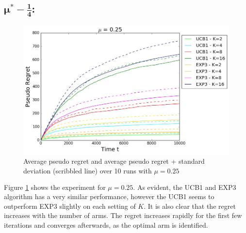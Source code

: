 \documentclass{article}
\begin{document}
\subsection{$\mathbf{\mu^* - \frac{1}{4}}$:}
\begin{figure}[H]
 \centering  \includegraphics[width=17cm]{fig/000.jpg}
  \caption{\footnotesize Average pseudo regret and average pseudo regret + standard deviation (scribbled line) over 10 runs with $\mu = 0.25$ }
\label{fig:1}
\end{figure}
Figure \ref{fig:1} shows the experiment for $\mu = 0.25$. As evident, the UCB1 and EXP3 algorithm has a very similar performance, however the UCB1 seems to outperform EXP3 slightly on each setting of $K$. It is also clear that the regret increases with the number of arms. The regret increases rapidly for the first few iterations and converges afterwards, as the optimal arm is identified.
\end{document}
